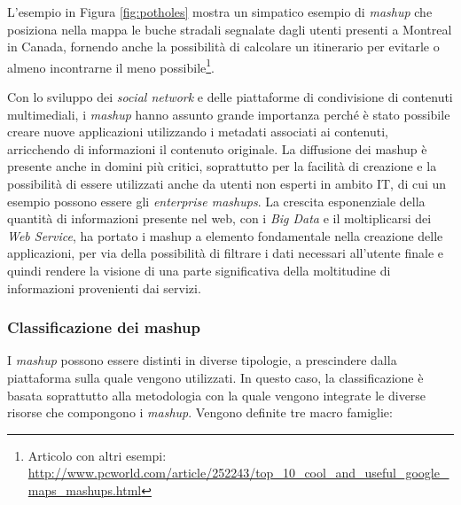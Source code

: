 L'esempio in Figura \ref{fig:potholes} mostra un simpatico esempio di \emph{mashup} che posiziona nella mappa le buche stradali segnalate dagli utenti presenti a Montreal in Canada, fornendo anche la possibilità di calcolare un itinerario per evitarle o almeno incontrarne il meno possibile\footnote{Articolo con altri esempi: \url{http://www.pcworld.com/article/252243/top_10_cool_and_useful_google_maps_mashups.html}}. 

Con lo sviluppo dei \emph{social network} e delle piattaforme di condivisione di contenuti multimediali, i \emph{mashup} hanno assunto grande importanza perché è stato possibile creare nuove applicazioni utilizzando i metadati associati ai contenuti, arricchendo di informazioni il contenuto originale.
La diffusione dei mashup è presente anche in domini più critici, soprattutto per la facilità di creazione e la possibilità di essere utilizzati anche da utenti non esperti in ambito IT, di cui un esempio possono essere gli \emph{enterprise mashups}.
La crescita esponenziale della quantità di informazioni presente nel web, con i \emph{Big Data} e il moltiplicarsi dei \emph{Web Service}, ha portato i mashup a elemento fondamentale nella creazione delle applicazioni, per via della possibilità di filtrare i dati necessari all'utente finale e quindi rendere la visione di una parte significativa della moltitudine di informazioni provenienti dai servizi.


\subsubsection{Classificazione dei mashup\label{sec:mashup-classification}}

I \emph{mashup} possono essere distinti in diverse tipologie, a prescindere dalla piattaforma sulla quale vengono utilizzati.
In questo caso, la classificazione è basata soprattutto alla metodologia con la quale vengono integrate le diverse risorse che compongono i \emph{mashup}. Vengono definite tre macro famiglie:

